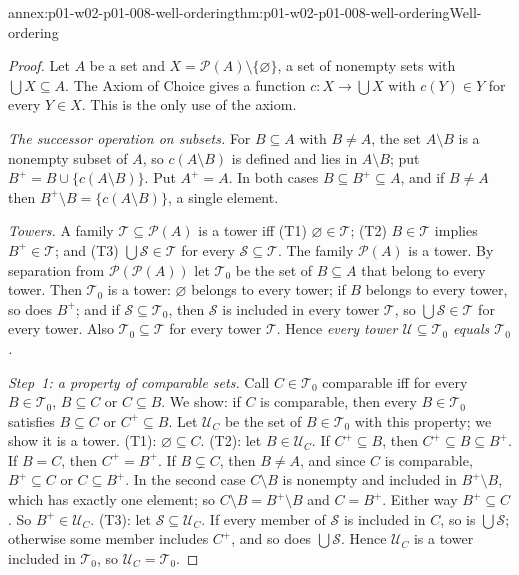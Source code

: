 \begin{annexitem}{annex:p01-w02-p01-008-well-ordering}{thm:p01-w02-p01-008-well-ordering}{Well-ordering}
\begin{proof}
Let \(A\) be a set and \(X=\mathcal P(A)\setminus\{\varnothing\}\), a set
of nonempty sets with \(\bigcup X\subseteq A\). The Axiom of Choice gives a
function \(c:X\to\bigcup X\) with \(c(Y)\in Y\) for every \(Y\in X\). This
is the only use of the axiom.

\emph{The successor operation on subsets.} For \(B\subseteq A\) with
\(B\neq A\), the set \(A\setminus B\) is a nonempty subset of \(A\), so
\(c(A\setminus B)\) is defined and lies in \(A\setminus B\); put
\(B^{+}=B\cup\{c(A\setminus B)\}\). Put \(A^{+}=A\). In both cases
\(B\subseteq B^{+}\subseteq A\), and if \(B\neq A\) then
\(B^{+}\setminus B=\{c(A\setminus B)\}\), a single element.

\emph{Towers.} A family \(\mathcal T\subseteq\mathcal P(A)\) is a tower iff
(T1) \(\varnothing\in\mathcal T\); (T2) \(B\in\mathcal T\) implies
\(B^{+}\in\mathcal T\); and (T3) \(\bigcup\mathcal S\in\mathcal T\) for every
\(\mathcal S\subseteq\mathcal T\). The family \(\mathcal P(A)\) is a tower.
By separation from \(\mathcal P(\mathcal P(A))\) let \(\mathcal T_0\) be the
set of \(B\subseteq A\) that belong to every tower. Then \(\mathcal T_0\)
is a tower: \(\varnothing\) belongs to every tower; if \(B\) belongs to every
tower, so does \(B^{+}\); and if \(\mathcal S\subseteq\mathcal T_0\), then
\(\mathcal S\) is included in every tower \(\mathcal T\), so
\(\bigcup\mathcal S\in\mathcal T\) for every tower. Also
\(\mathcal T_0\subseteq\mathcal T\) for every tower \(\mathcal T\). Hence
\emph{every tower \(\mathcal U\subseteq\mathcal T_0\) equals
\(\mathcal T_0\).}

\emph{Step~1: a property of comparable sets.} Call \(C\in\mathcal T_0\)
comparable iff for every \(B\in\mathcal T_0\), \(B\subseteq C\) or
\(C\subseteq B\). We show: if \(C\) is comparable, then every
\(B\in\mathcal T_0\) satisfies \(B\subseteq C\) or \(C^{+}\subseteq B\). Let
\(\mathcal U_C\) be the set of \(B\in\mathcal T_0\) with this property; we
show it is a tower. (T1): \(\varnothing\subseteq C\). (T2): let
\(B\in\mathcal U_C\). If \(C^{+}\subseteq B\), then
\(C^{+}\subseteq B\subseteq B^{+}\). If \(B=C\), then \(C^{+}=B^{+}\). If
\(B\subsetneq C\), then \(B\neq A\), and since \(C\) is comparable,
\(B^{+}\subseteq C\) or \(C\subseteq B^{+}\). In the second case
\(C\setminus B\) is nonempty and included in \(B^{+}\setminus B\), which has
exactly one element; so \(C\setminus B=B^{+}\setminus B\) and \(C=B^{+}\).
Either way \(B^{+}\subseteq C\). So \(B^{+}\in\mathcal U_C\). (T3): let
\(\mathcal S\subseteq\mathcal U_C\). If every member of \(\mathcal S\) is
included in \(C\), so is \(\bigcup\mathcal S\); otherwise some member
includes \(C^{+}\), and so does \(\bigcup\mathcal S\). Hence \(\mathcal U_C\)
is a tower included in \(\mathcal T_0\), so \(\mathcal U_C=\mathcal T_0\).


\end{proof}
\end{annexitem}
